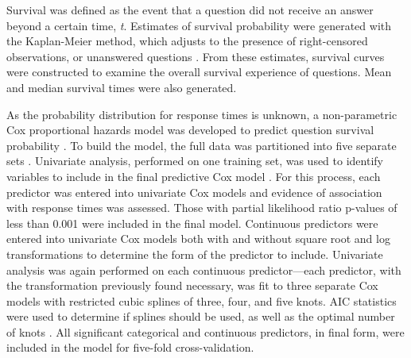 \documentclass[]{interact}\usepackage[]{graphicx}\usepackage[]{color}
\begin{document}
Survival was defined as the event that a question did not receive an answer beyond a certain time, \textit{t}. Estimates of survival probability were generated with the Kaplan-Meier method, which adjusts to the presence of right-censored observations, or unanswered questions \cite{Bland1998}. From these estimates, survival curves were constructed to examine the overall survival experience of questions. Mean and median survival times were also generated. 

As the probability distribution for response times is unknown, a non-parametric Cox proportional hazards model was developed to predict question survival probability \cite{Moore2010}. To build the model, the full data was partitioned into five separate sets \cite{Rodriguez2010}. Univariate analysis, performed on one training set, was used to identify variables to include in the final predictive Cox model \cite{Hammermeister1979}. For this process, each predictor was entered into univariate Cox models and evidence of association with response times was assessed. Those with partial likelihood ratio p-values of less than 0.001 were included in the final model.  Continuous predictors were entered into univariate Cox models both with and without square root and log transformations to determine the form of the predictor to include. Univariate analysis was again performed on each continuous predictor---each predictor, with the transformation previously found necessary, was fit to three separate Cox models with restricted cubic splines of three, four, and five knots. AIC statistics were used to determine if splines should be used, as well as the optimal number of knots \cite{Harrell2015}. All significant categorical and continuous predictors, in final form, were included in the model for five-fold cross-validation. %
\end{document}
